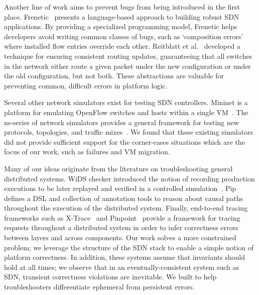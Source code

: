 {{Another line of work aims to prevent bugs from being introduced in the first
place. Frenetic~\cite{frenetic} presents a language-based approach to building
robust SDN applications. By providing a specialized programming model,
 Frenetic helps developers avoid writing common classes of
bugs, such as `composition errors' where installed flow entries override each other.
Reitblatt et al.~\cite{consistentupdates} developed a technique for ensuring
consistent routing updates, guaranteeing that all switches in the network either route
a given packet under the new configuration or under the old configuration,
but not both. These abstractions are valuable for preventing common, difficult errors
in platform logic.

Several other network simulators exist for testing SDN controllers. Mininet is a
platform for emulating OpenFlow switches and hosts within a single
 VM~\cite{Lantz:2010:NLR:1868447.1868466}. The ns-series of network simulators
provides a general framework for testing new protocols, topologies,
and traffic mixes~\cite{ns3}. We found that these existing simulators did
not provide sufficient support for the corner-cases situations which are the
focus of our work, such as failures and VM migration.

Many of our ideas originate from the literature on troubleshooting general
distributed systems. WiDS checker introduced the notion of recording
production executions to be later replayed and verified in a controlled simulation~\cite{Liu07widschecker:}.
Pip~\cite{pip} defines a DSL and collection of annotation tools to
reason about causal paths throughout the execution of the
distributed system. Finally, end-to-end tracing
frameworks such as X-Trace~\cite{Fonseca:2007:XPN:1973430.1973450} and
Pinpoint~\cite{Chen02pinpoint:problem} provide a framework for tracing requests throughout
a distributed system in order to infer correctness errors between layers and
across components. Our work solves a more constrained problem; we leverage
the structure of the SDN stack to enable a simple notion of platform
correctness. In addition, these systems assume that invariants should hold at
all times; we observe that in an eventually-consistent system such as SDN,
transient correctness violations are inevitable. We built \simulator{} to help troubleshooters
differentiate ephemeral from persistent errors.


}
}
